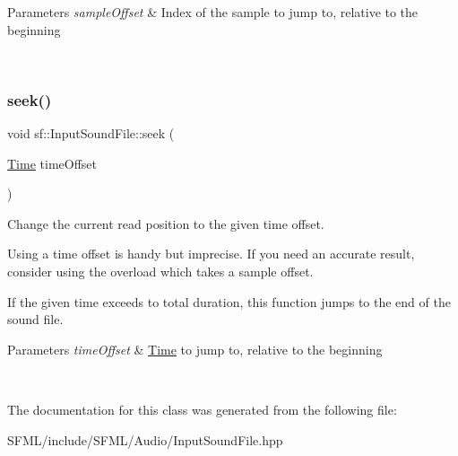 \begin{DoxyParams}{Parameters}
{\em sample\+Offset} & Index of the sample to jump to, relative to the beginning \begin{DoxyVerb}\end{DoxyVerb}
 \\
\hline
\end{DoxyParams}
\mbox{\label{classsf_1_1_input_sound_file_a8eee7af58ad75ddc61f93ad72e2d66c1}} 
\subsubsection{\texorpdfstring{seek()}{seek()}\hspace{0.1cm}{\footnotesize\ttfamily [2/2]}}
{\footnotesize\ttfamily void sf\+::\+Input\+Sound\+File\+::seek (\begin{DoxyParamCaption}\item[{\mbox{\hyperlink{classsf_1_1_time}{Time}}}]{time\+Offset }\end{DoxyParamCaption})}



Change the current read position to the given time offset. 

Using a time offset is handy but imprecise. If you need an accurate result, consider using the overload which takes a sample offset.

If the given time exceeds to total duration, this function jumps to the end of the sound file.


\begin{DoxyParams}{Parameters}
{\em time\+Offset} & \mbox{\hyperlink{classsf_1_1_time}{Time}} to jump to, relative to the beginning \begin{DoxyVerb}\end{DoxyVerb}
 \\
\hline
\end{DoxyParams}


The documentation for this class was generated from the following file\+:\begin{DoxyCompactItemize}
\item 
S\+F\+M\+L/include/\+S\+F\+M\+L/\+Audio/Input\+Sound\+File.\+hpp\end{DoxyCompactItemize}
